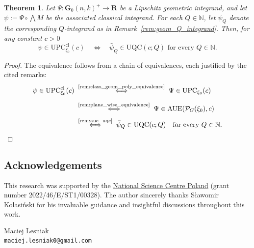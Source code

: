\documentclass[a4paper,twoside,reqno]{article}
\theoremstyle{definition}
\theoremstyle{remark}
\theoremstyle{plain}
\newtheorem{theorem}{Theorem}[section]
\theoremstyle{remark}
\theoremstyle{definition}
\newcommand{\ograss}[2]{\mathbf{G}_0(#1,#2)}
\newcommand{\natp}{\mathbb{N}}
\newcommand{\UPC}{\mathrm{UPC}}
\newcommand{\AUE}{\mathrm{AUE}}
\newcommand{\UQC}{\mathrm{UQC}}
\newcommand{\R}{\mathbf{R}}
\newcommand{\tbwedge}{{\textstyle \boldsymbol{\bigwedge}}}
\begin{document}
\begin{theorem}\label{thm:main3}
    Let $\Psi : \ograss{n}{k}^{+} \to \R$ be a Lipschitz geometric 
    integrand, and let $\psi := \Psi \circ \tbwedge M$ be the associated 
    classical integrand. For each $Q \in \natp$, let $\bar{\psi}_Q$ denote 
    the corresponding $Q$-integrand as in Remark~\ref{rem:geom_Q_integrand}. 
    Then, for any constant $c > 0$
    \[
        \psi \in \UPC^{\text{cl}}_{\xi_0}(c) \quad \Longleftrightarrow \quad
        \bar{\psi}_Q \in \UQC(c; Q) \text{ for every } Q \in \natp.
    \]
\end{theorem}

\begin{proof}
    The equivalence follows from a chain of equivalences, each justified by the cited remarks:
    \begin{align*}
        \psi \in \UPC^{\mathrm{cl}}_{\xi_0}(c)
        &\;\overset{\text{\ref{rem:class_geom_poly_equivalence}}}{\Longleftrightarrow}\;
        \Psi \in \UPC_{\xi_0}(c) \\[2mm]
        &\;\overset{\text{\ref{rem:plane_wise_equivalence}}}{\Longleftrightarrow}\;
        \Psi \in \AUE(\mathcal{P}_G(\xi_0), c) \\[1mm]
        &\;\overset{\text{\ref{rem:aue_uqc}}}{\Longleftrightarrow}\;
        \bar{\psi}_Q \in \UQC(c; Q) \quad \text{for every } Q \in \natp.
    \end{align*}
\end{proof}

\subsection*{Acknowledgements}
This research was supported by the \href{https://ncn.gov.pl/}{National Science Centre Poland} 
(grant number 2022/46/E/ST1/00328). The author sincerely thanks Sławomir Kolasiński 
for his invaluable guidance and insightful discussions throughout this work.

{\small

{}
}

\bigskip

{
\small \noindent
Maciej Lesniak
\\
\texttt{maciej.lesniak0@gmail.com}
}
\end{document}
